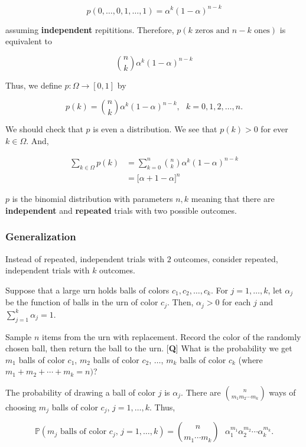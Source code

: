 \documentclass[12pt]{article}
\newcommand{\prob}[1]{\mathbb{P}(#1)}
\begin{document}
\begin{equation*}
p(0, \ldots, 0, 1, \ldots, 1) = \alpha^k (1- \alpha)^{n-k}
\end{equation*}

\noindent
assuming \textbf{independent} repititions. Therefore, $p(k \text{ zeros and } n-k \text{ ones})$ is equivalent to

\begin{equation*}
{n \choose k} \alpha^k (1- \alpha)^{n-k}
\end{equation*}

\noindent
Thus, we define $p : \Omega \rightarrow [0,1]$ by

\begin{equation*}
p(k) = {n \choose k} \alpha^k (1-\alpha)^{n-k}, \text{ } k = 0,1,2, \ldots, n.
\end{equation*}

\noindent
We should check that $p$ is even a distribution. We see that $p(k) > 0$ for ever $k \in \Omega$. And,

\begin{align*}
\sum_{k \in \Omega} p(k) & = \sum_{k = 0}^{n} {n \choose k} \alpha^k (1-\alpha)^{n-k} \\
& = \big [ \alpha + 1 - \alpha \big ]^n
\end{align*}

\noindent
$p$ is the binomial distribution with parameters $n, k$ meaning that there are \textbf{independent} and \textbf{repeated} trials with two possible outcomes.

\subsubsection*{Generalization}
Instead of repeated, independent trials with $2$ outcomes, consider repeated, independent trials with $k$ outcomes. 

\vspace*{.3cm}
\begin{tcolorbox}
Suppose that a large urn holds balls of colors $c_1, c_2, \ldots, c_k$. For $j = 1, \ldots, k$, let $\alpha_j$ be the function of balls in the urn of color $c_j$. Then, $\alpha_j > 0$ for each $j$ and $\sum_{j=1}^{k} \alpha_j = 1$.

\noindent
Sample $n$ items from the urn with replacement. Record the color of the randomly chosen ball, then return the ball to the urn. [\textbf{Q}] What is the probability we get $m_1$ balls of color $c_1$, $m_2$ balls of color $c_2$, $\ldots$, $m_k$ balls of color $c_k$ (where $m_1 + m_2 + \cdots + m_k = n)$? 

\noindent
The probability of drawing a ball of color $j$ is $\alpha_j$. There are ${n \choose m_1 m_2 \cdots m_k}$ ways of choosing $m_j$ balls of color $c_j$, $j = 1, \ldots, k$. Thus, 

\begin{equation*}
\prob{m_j \text{ balls of color } c_j \text{, } j = 1, \ldots, k} = {n \choose m_1 \cdots m_k} \text{ } \alpha_1^{m_1} \alpha_2^{m_2} \cdots \alpha_k^{m_k}.
\end{equation*}
\end{tcolorbox}
\end{document}
